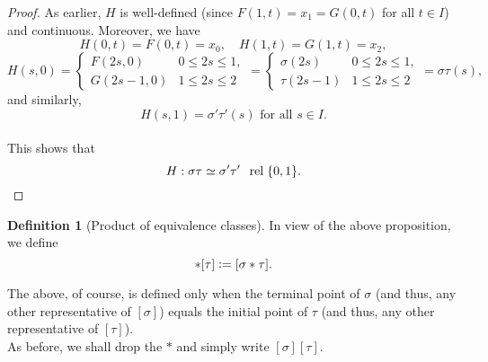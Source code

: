 \documentclass[12pt]{article}
\theoremstyle{definition}
\numberwithin{thm}{section}
\newtheorem{defn}[thm]{Definition}
\newcommand{\rel}{\;\;\operatorname{rel}\;}
\begin{document}
\begin{proof}
	As earlier, $H$ is well-defined (since $F(1, t) = x_1 = G(0, t)$ for all $t \in I$) and continuous. Moreover, we have
	\begin{equation*} 
		H(0, t) = F(0, t) = x_0, \quad H(1, t) = G(1, t) = x_2,
	\end{equation*}
	\begin{equation*} 
		H(s, 0)= \begin{cases}
				F(2s, 0) & 0 \le 2s \le 1,\\
				G(2s - 1, 0) & 1 \le 2s \le 2
			\end{cases} = \begin{cases}
				\sigma(2s) & 0 \le 2s \le 1,\\
				\tau(2s - 1) & 1 \le 2s \le 2
			\end{cases} = \sigma\tau(s),
	\end{equation*}
	and similarly, 
	\begin{equation*} 
		H(s, 1) = \sigma'\tau'(s)\text{ for all }s \in I.
	\end{equation*}\\
	This shows that 
	\begin{equation*} 
		H : \sigma\tau\simeq\sigma'\tau' \rel \{0, 1\}. \qedhere
	\end{equation*}
\end{proof}
\begin{defn}[Product of equivalence classes]
	In view of the above proposition, we define
	\begin{equation*} 
		[\sigma]*[\tau] \vcentcolon= [\sigma*\tau].
	\end{equation*}
\end{defn}
The above, of course, is defined only when the terminal point of $\sigma$ (and thus, any other representative of $[\sigma]$) equals the initial point of $\tau$ (and thus, any other representative of $[\tau]$).\\
As before, we shall drop the $*$ and simply write $[\sigma][\tau].$
\end{document}
